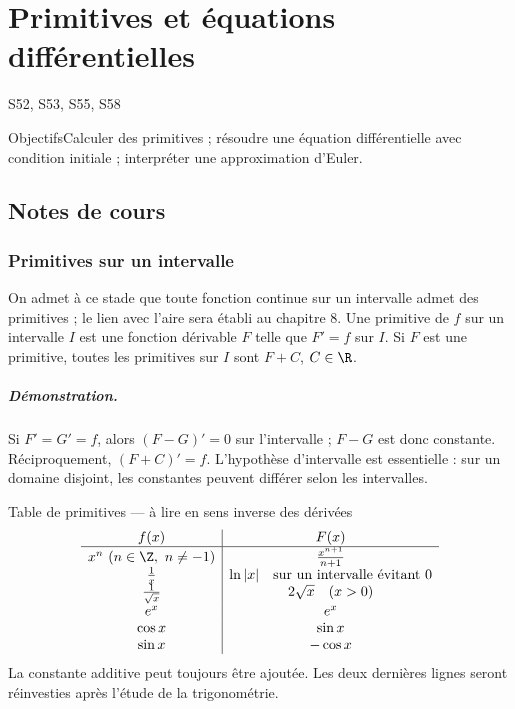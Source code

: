 \setcounter{chapter}{6}\chapter{Primitives et équations différentielles}\label{ch:7}

{\small\sffamily\color{teal}S52, S53, S55, S58\par}

\begin{retenir}{Objectifs}Calculer des primitives ; résoudre une équation différentielle avec condition initiale ; interpréter une approximation d'Euler.\end{retenir}

\section{Notes de cours}
\subsection{Primitives sur un intervalle}
On admet à ce stade que toute fonction continue sur un intervalle admet des primitives ; le lien avec l'aire sera établi au chapitre 8.
Une primitive de $f$ sur un intervalle $I$ est une fonction dérivable $F$ telle que $F'=f$ sur $I$. Si $F$ est une primitive, toutes les primitives sur $I$ sont $F+C$, $C\in\R$.
\paragraph{Démonstration.} Si $F'=G'=f$, alors $(F-G)'=0$ sur l'intervalle ; $F-G$ est donc constante. Réciproquement, $(F+C)'=f$. L'hypothèse d'intervalle est essentielle : sur un domaine disjoint, les constantes peuvent différer selon les intervalles.
\begin{retenir}{Table de primitives --- à lire en sens inverse des dérivées}
\[\begin{array}{c|c}
f(x)&F(x)\\\hline
x^n\ (n\in\Z,\ n\ne-1)&\frac{x^{n+1}}{n+1}\\
\frac{1}{x}&\ln|x|\quad\text{sur un intervalle évitant }0\\
\frac{1}{\sqrt{x}}&2\sqrt{x}\quad(x>0)\\
e^x&e^x\\
\cos x&\sin x\\
\sin x&-\cos x
\end{array}\]
La constante additive peut toujours être ajoutée. Les deux dernières lignes seront réinvesties après l'étude de la trigonométrie.
\end{retenir}
